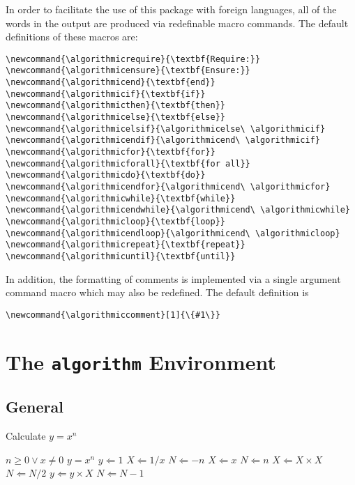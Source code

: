 \documentclass{article}
\newcommand{\keyword}[1]{\texttt{#1}}
\begin{document}
In order to facilitate the use of this package with foreign languages, all
of the words in the output are produced via redefinable macro commands.
The default definitions of these macros are:
\begin{verbatim}
\newcommand{\algorithmicrequire}{\textbf{Require:}}
\newcommand{\algorithmicensure}{\textbf{Ensure:}}
\newcommand{\algorithmicend}{\textbf{end}}
\newcommand{\algorithmicif}{\textbf{if}}
\newcommand{\algorithmicthen}{\textbf{then}}
\newcommand{\algorithmicelse}{\textbf{else}}
\newcommand{\algorithmicelsif}{\algorithmicelse\ \algorithmicif}
\newcommand{\algorithmicendif}{\algorithmicend\ \algorithmicif}
\newcommand{\algorithmicfor}{\textbf{for}}
\newcommand{\algorithmicforall}{\textbf{for all}}
\newcommand{\algorithmicdo}{\textbf{do}}
\newcommand{\algorithmicendfor}{\algorithmicend\ \algorithmicfor}
\newcommand{\algorithmicwhile}{\textbf{while}}
\newcommand{\algorithmicendwhile}{\algorithmicend\ \algorithmicwhile}
\newcommand{\algorithmicloop}{\textbf{loop}}
\newcommand{\algorithmicendloop}{\algorithmicend\ \algorithmicloop}
\newcommand{\algorithmicrepeat}{\textbf{repeat}}
\newcommand{\algorithmicuntil}{\textbf{until}}
\end{verbatim}

In addition, the formatting of comments is implemented via a single
argument command macro which may also be redefined.
The default definition is
\begin{verbatim}
\newcommand{\algorithmiccomment}[1]{\{#1\}}
\end{verbatim}

\section{The \keyword{algorithm} Environment}

\subsection{General}
\begin{algorithm}
\caption{Calculate $y = x^n$}
\label{alg1}
\begin{algorithmic}
\REQUIRE $n \geq 0 \vee x \neq 0$
\ENSURE $y = x^n$
\STATE $y \Leftarrow 1$
\STATE $X \Leftarrow 1 / x$
\STATE $N \Leftarrow -n$
\ELSE
\STATE $X \Leftarrow x$
\STATE $N \Leftarrow n$
\ENDIF
{}
\STATE $X \Leftarrow X \times X$
\STATE $N \Leftarrow N / 2$
\ELSE[$N$ is odd]
\STATE $y \Leftarrow y \times X$
\STATE $N \Leftarrow N - 1$
\ENDIF
\ENDWHILE
\end{algorithmic}
\end{algorithm}
\end{document}
